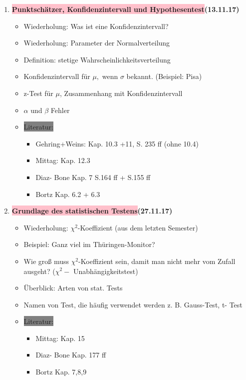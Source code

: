 \documentclass[a4paper,fontsize=16pt]{article}
\begin{document}
\begin{enumerate}
    \item{\textbf{\colorbox{pink}{Punktschätzer, Konfidenzintervall und Hypothesentest}(13.11.17)}
     \begin{itemize}
          \item{Wiederholung: Was ist eine Konfidenzintervall?} %
          \item{Wiederholung: Parameter der Normalverteilung}
          \item{Definition: stetige Wahrscheinlichkeitsverteilung}
          \item{Konfidenzintervall für $\mu,$ wenn $\sigma$ bekannt. (Beispiel: Pisa)}
          \item{z-Test für $\mu$, Zusammenhang mit Konfidenzintervall}
          \item{$\alpha$ und $\beta$ Fehler}
          \item{\colorbox{gray}{Literatur:} 
          \begin{itemize}
       \item{ Gehring+Weins: Kap. 10.3 +11, S. 235 ff (ohne 10.4)}
       \item{Mittag: Kap. 12.3}
       \item{Diaz- Bone Kap. 7 S.164 ff + S.155 ff }
       \item{Bortz Kap. 6.2 + 6.3} 
       \end{itemize}}
           
     \end{itemize}
   }
   
      \item{\textbf{\colorbox{pink}{Grundlage des statistischen Testens}(27.11.17)}
     \begin{itemize}
          \item{Wiederholung: $\chi^2$-Koeffizient (aus dem letzten Semester)} %
          \item{Beispiel: Ganz viel im Thüringen-Monitor?}
          \item{Wie groß muss $\chi^2$-Koeffizient sein, damit man nicht mehr vom Zufall ausgeht? ($\chi^{2}-$ Unabhängigkeitstest)}
          \item{Überblick: Arten von stat. Tests}
          \item{Namen von Test, die häufig verwendet werden z. B. Gauss-Test, t- Test}
          \item{\colorbox{gray}{Literatur:} 
          \begin{itemize}
       \item{Mittag: Kap. 15}
       \item{Diaz- Bone Kap. 177 ff }
       \item{Bortz Kap. 7,8,9} 
       \end{itemize}}
     \end{itemize}
   }
  

\end{enumerate}
\end{document}
